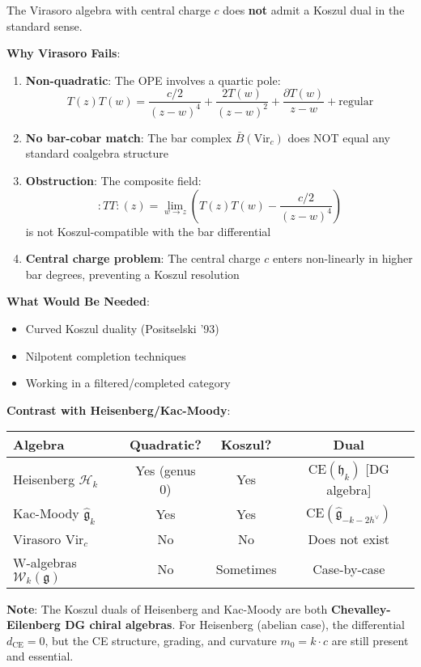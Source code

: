 \begin{remark}
The Virasoro algebra with central charge $c$ does \textbf{not} admit a Koszul dual in the standard sense.

\textbf{Why Virasoro Fails}:
\begin{enumerate}
\item \textbf{Non-quadratic}: The OPE involves a quartic pole:
\begin{equation}
T(z)T(w) = \frac{c/2}{(z-w)^4} + \frac{2T(w)}{(z-w)^2} + \frac{\partial T(w)}{z-w} + \text{regular}
\end{equation}

\item \textbf{No bar-cobar match}: The bar complex $\bar{B}(\text{Vir}_c)$ does NOT equal any standard coalgebra structure

\item \textbf{Obstruction}: The composite field:
\begin{equation}
:TT:(z) = \lim_{w \to z} \left( T(z)T(w) - \frac{c/2}{(z-w)^4} \right)
\end{equation}
is not Koszul-compatible with the bar differential

\item \textbf{Central charge problem}: The central charge $c$ enters non-linearly in higher bar degrees, preventing a Koszul resolution
\end{enumerate}

\textbf{What Would Be Needed}:
\begin{itemize}
\item Curved Koszul duality (Positselski '93)
\item Nilpotent completion techniques
\item Working in a filtered/completed category
\end{itemize}

\textbf{Contrast with Heisenberg/Kac-Moody}:
\begin{center}
\begin{tabular}{|l|c|c|c|}
\hline
\textbf{Algebra} & \textbf{Quadratic?} & \textbf{Koszul?} & \textbf{Dual} \\
\hline
Heisenberg $\mathcal{H}_k$ & Yes (genus 0) & Yes & $\text{CE}(\mathfrak{h}_k)$ [DG algebra] \\
Kac-Moody $\widehat{\mathfrak{g}}_k$ & Yes & Yes & $\text{CE}(\widehat{\mathfrak{g}}_{-k-2h^\vee})$ \\
Virasoro $\text{Vir}_c$ & No & No & Does not exist \\
W-algebras $\mathcal{W}_k(\mathfrak{g})$ & No & Sometimes & Case-by-case \\
\hline
\end{tabular}
\end{center}

\textbf{Note}: The Koszul duals of Heisenberg and Kac-Moody are both \textbf{Chevalley-Eilenberg DG chiral algebras}. For Heisenberg (abelian case), the differential $d_{\text{CE}} = 0$, but the CE structure, grading, and curvature $m_0 = k \cdot c$ are still present and essential.
\end{remark}

